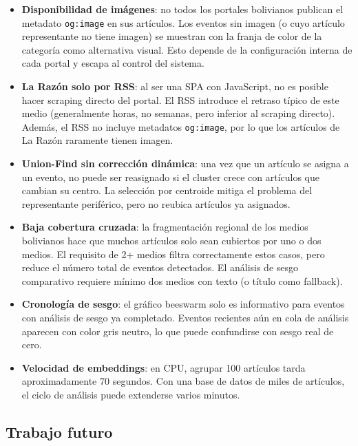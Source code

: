 \documentclass[12pt,a4paper]{article}
\begin{document}
\begin{itemize}[nosep]
  \item \textbf{Disponibilidad de imágenes}: no todos los portales bolivianos publican el metadato \texttt{og:image} en sus artículos. Los eventos sin imagen (o cuyo artículo representante no tiene imagen) se muestran con la franja de color de la categoría como alternativa visual. Esto depende de la configuración interna de cada portal y escapa al control del sistema.

  \item \textbf{La Razón solo por RSS}: al ser una SPA con JavaScript, no es posible hacer scraping directo del portal. El RSS introduce el retraso típico de este medio (generalmente horas, no semanas, pero inferior al scraping directo). Además, el RSS no incluye metadatos \texttt{og:image}, por lo que los artículos de La Razón raramente tienen imagen.

  \item \textbf{Union-Find sin corrección dinámica}: una vez que un artículo se asigna a un evento, no puede ser reasignado si el cluster crece con artículos que cambian su centro. La selección por centroide mitiga el problema del representante periférico, pero no reubica artículos ya asignados.

  \item \textbf{Baja cobertura cruzada}: la fragmentación regional de los medios bolivianos hace que muchos artículos solo sean cubiertos por uno o dos medios. El requisito de 2+ medios filtra correctamente estos casos, pero reduce el número total de eventos detectados. El análisis de sesgo comparativo requiere mínimo dos medios con texto (o título como fallback).

  \item \textbf{Cronología de sesgo}: el gráfico beeswarm solo es informativo para eventos con análisis de sesgo ya completado. Eventos recientes aún en cola de análisis aparecen con color gris neutro, lo que puede confundirse con sesgo real de cero.

  \item \textbf{Velocidad de embeddings}: en CPU, agrupar 100 artículos tarda aproximadamente 70 segundos. Con una base de datos de miles de artículos, el ciclo de análisis puede extenderse varios minutos.
\end{itemize}

\subsection*{Trabajo futuro}
\end{document}
